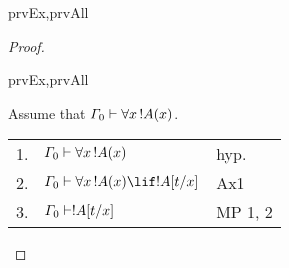 \documentclass[../../include/open-logic-section]{subfiles}
\begin{document}
\begin{thm} 
\begin{tagenumerate}{prvEx,prvAll} 
\end{tagenumerate} 
\end{thm}

\begin{proof} 
\begin{tagenumerate}{prvEx,prvAll} 
 {Assume that  $\Gamma_0 \Proves \lforall[x][!A(x)]$.

\begin{tabular}{rll} 
1. & $\Gamma_0 \Proves \lforall[x][!A(x)]$ & hyp. \\
2. & $\Gamma_0 \Proves \lforall[x][!A(x)] \lif \Subst{!A}{t}{x}$ & Ax1 \\ 
3. & $\Gamma_0 \Proves \Subst{!A}{t}{x}$ & MP 1, 2 \\ 
\end{tabular}}{}

\end{tagenumerate} 
\end{proof}
\end{document}
